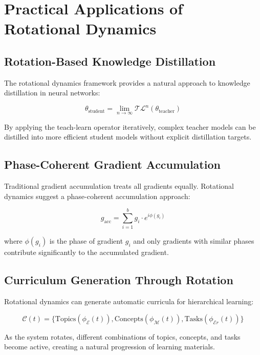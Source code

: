 \section{Practical Applications of Rotational Dynamics}

\subsection{Rotation-Based Knowledge Distillation}

The rotational dynamics framework provides a natural approach to knowledge distillation in neural networks:

\begin{equation}
\theta_{\text{student}} = \lim_{n \rightarrow \infty} \mathcal{TL}^n(\theta_{\text{teacher}})
\end{equation}

By applying the teach-learn operator iteratively, complex teacher models can be distilled into more efficient student models without explicit distillation targets.

\subsection{Phase-Coherent Gradient Accumulation}

Traditional gradient accumulation treats all gradients equally. Rotational dynamics suggest a phase-coherent accumulation approach:

\begin{equation}
g_{\text{acc}} = \sum_{i=1}^b g_i \cdot e^{i\phi(g_i)}
\end{equation}

where $\phi(g_i)$ is the phase of gradient $g_i$ and only gradients with similar phases contribute significantly to the accumulated gradient.

\subsection{Curriculum Generation Through Rotation}

Rotational dynamics can generate automatic curricula for hierarchical learning:

\begin{equation}
\mathcal{C}(t) = \{\text{Topics}(\phi_{\mathcal{E}}(t)), \text{Concepts}(\phi_{\mathcal{M}}(t)), \text{Tasks}(\phi_{\mathcal{E}r}(t))\}
\end{equation}

As the system rotates, different combinations of topics, concepts, and tasks become active, creating a natural progression of learning materials.

